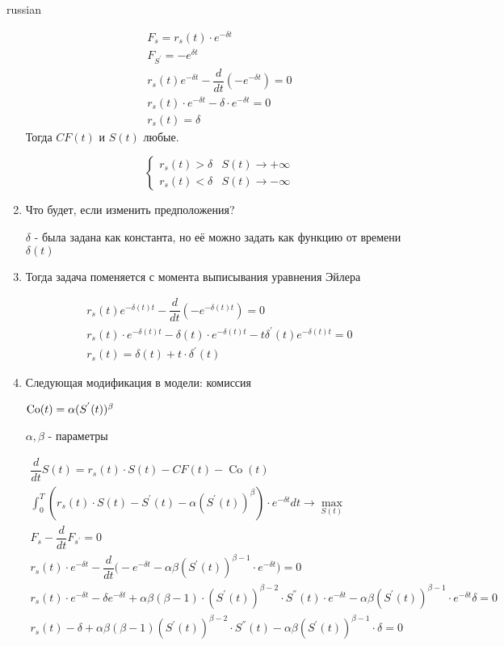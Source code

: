 \documentclass{article}
\begin{document}
\begin{otherlanguage*}{russian}
\begin{enumerate}
\begin{align*}
F_s = r_s (t) \cdot e ^{-\delta t } \\
F_{S^{'}} = -e^{\delta t} \\
r_s (t) e^{-\delta t} - \dfrac{d}{dt} (- e ^ {-\delta t} ) = 0 \\
r_s (t) \cdot e ^ {-\delta t} - \delta \cdot e ^{-\delta t} = 0 \\
r_s(t) = \delta 
\end{align*} 
Тогда $ CF(t) $ и $ S(t) $ любые.

\begin{equation*}
\begin{cases}
r_s (t) > \delta & S(t) \rightarrow + \infty \\
r_s(t) < \delta & S(t) \rightarrow - \infty 
\end{cases}
\end{equation*}

\item Что будет, если изменить предположения? 

$ \delta $ - была задана как константа, но её можно задать как функцию от времени $ \delta (t) $ 

\item  Тогда задача поменяется с момента выписывания уравнения Эйлера 

\begin{align*}
r_s (t) e^{-\delta (t) t} - \dfrac{d}{dt} ( - e^{- \delta (t) t} ) = 0  \\
r_s (t) \cdot e ^{-\delta (t) t } - \delta (t) \cdot e ^{-\delta (t) t} - t \delta^{'} (t) e^{- \delta (t) t} = 0 \\
r_s (t) = \delta (t) + t \cdot \delta ^{'} (t) 
\end{align*}

\item Следующая модификация в модели: комиссия

$ \operatorname{Co} (t) = \alpha (S^{'} (t) ) ^ \beta \\ $

$ \alpha, \beta $ - параметры 

\begin{align*}
\dfrac{d}{dt} S(t) = r_s(t) \cdot S(t) - CF(t) - \operatorname{Co}(t) \\
\int_0^T (r_s (t) \cdot S(t) - S^{'} (t) - \alpha ( S^{'} (t) ) ^ \beta ) \cdot e ^{-\delta t} dt  \rightarrow \max_{S(t)} \\
F_s - \dfrac{d}{dt} F_{s^{'}} = 0 \\
r_s (t) \cdot e ^{-\delta t} - \dfrac{d}{dt} \Big( -e ^{-\delta t} - \alpha \beta (S^{'} (t) ) ^ {\beta - 1} \cdot e ^ {-\delta t} \Big) = 0 \\
r_s (t) \cdot e ^{ - \delta t} - \delta e ^ {-\delta t} + \alpha \beta ( \beta -1 ) \cdot (S^{'} (t) ) ^{\beta -2} \cdot S ^{''} (t) \cdot e ^{ - \delta t} - \alpha \beta (S^{'} (t) ) ^{\beta - 1} \cdot e ^{-\delta t} \delta = 0 \\
r_s(t) - \delta + \alpha \beta (\beta - 1) (S^{'} (t) ) ^{\beta - 2} \cdot S ^{''} (t) - \alpha \beta (S ^{'} (t) ) ^{\beta - 1} \cdot \delta = 0 
\end{align*}


\end{enumerate}
\end{otherlanguage*}
\end{document}
